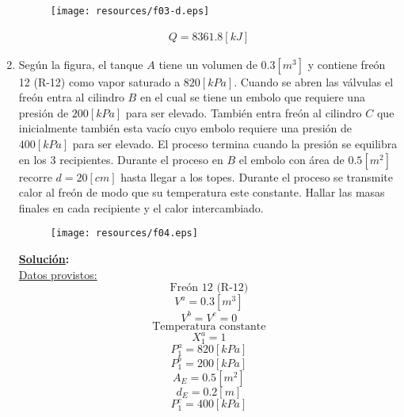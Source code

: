 \documentclass[letter,11pt]{article}
\begin{document}
\begin{enumerate}
\begin{figure}[H]
\centering
\texttt{[image: resources/f03-d.eps]}
\end{figure}

\begin{equation*}
\boxed{
    \begin{array}{l}
        Q = 8361.8[kJ]
    \end{array}
}
\end{equation*}
\newpage

\item Según la figura, el tanque $A$ tiene un volumen de $0.3[m^3]$ y contiene
freón 12 (R-12) como vapor saturado a $820[kPa]$. Cuando se abren las válvulas
el freón entra al cilindro $B$ en el cual se tiene un embolo que requiere una
presión de $200[kPa]$ para ser elevado. También entra freón al cilindro $C$ que
inicialmente también esta vacío cuyo embolo requiere una presión de $400[kPa]$
para ser elevado. El proceso termina cuando la presión se equilibra en los 3
recipientes. Durante el proceso en $B$ el embolo con área de $0.5[m^2]$ recorre
$d=20[cm]$ hasta llegar a los topes. Durante el proceso se transmite calor al
freón de modo que su temperatura este constante. Hallar las masas finales en
cada recipiente y el calor intercambiado.

\begin{figure}[H]
\centering
\texttt{[image: resources/f04.eps]}
\end{figure}

\textbf{\underline{Solución}:} \\

\underline{Datos provistos:}
\begin{equation*}
    \text{Freón 12 (R-12)}
\end{equation*}
\begin{equation*}
    V^a = 0.3[m^3]
\end{equation*}
\begin{equation*}
    V^b = V^c = 0
\end{equation*}
\begin{equation*}
    \text{Temperatura constante}
\end{equation*}
\begin{equation*}
    X_1^a = 1
\end{equation*}
\begin{equation*}
    P_1^a = 820[kPa]
\end{equation*}
\begin{equation*}
    P_1^b = 200[kPa]
\end{equation*}
\begin{equation*}
    A_E = 0.5[m^2]
\end{equation*}
\begin{equation*}
    d_E = 0.2[m]
\end{equation*}
\begin{equation*}
    P_1^c = 400[kPa]
\end{equation*}


\end{enumerate}
\end{document}
